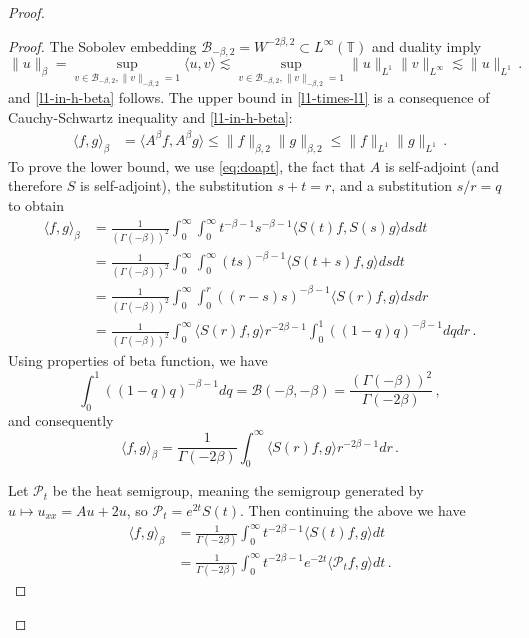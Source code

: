 \documentclass[final]{amsart}
\numberwithin{thm}{section}
\numberwithin{equation}{section}
\newcommand{\Pp}{\mathcal{P}}
\newcommand{\ip}[2]{\langle #1, #2 \rangle}
\newcommand{\T}{\mathbb{T}}
\newcommand{\B}{\mathcal{B}}
\begin{document}
\begin{proof}
\begin{proof}
    The Sobolev embedding $\B_{-\beta,2} = W^{-2\beta,2} \subset L^\infty(\T)$ and duality imply 
    $$
    \|u\|_\beta = \sup_{v \in \B_{-\beta,2}, \|v\|_{-\beta,2} = 1} \ip{u}{v} \lesssim \sup_{v \in \B_{-\beta,2}, \|v\|_{-\beta,2} = 1} \|u\|_{L^1}\|v\|_{L^\infty} \lesssim \|u\|_{L^1} \,.
    $$
and \ref{l1-in-h-beta} follows.  
The  upper bound in \ref{l1-times-l1} is a consequence of Cauchy-Schwartz inequality and \ref{l1-in-h-beta}: 
 \begin{align}
 \ip{f}{g}_\beta &= \ip{A^\beta f}{A^\beta g} \leq \|f\|_{\beta, 2}\|g\|_{\beta, 2} \leq \|f\|_{L^1} \|g\|_{L^1} \,.
 \end{align}
To prove the lower bound, we use \eqref{eq:doapt}, the fact that $A$ is self-adjoint (and therefore $S$ is self-adjoint), the substitution $s + t = r$, 
and a substitution $s/r = q$ to obtain
\begin{align*}
   \ip{f}{g}_\beta &= \frac{1}{(\Gamma(-\beta))^2} 
   \int_{0}^{\infty}\int_{0}^{\infty} t^{-\beta -1} s^{-\beta - 1} 
   \ip{S(t)f}{S(s)g} ds dt \\
   &=  
   \frac{1}{(\Gamma(-\beta))^2} 
   \int_{0}^{\infty}\int_{0}^{\infty} (ts)^{-\beta - 1} 
   \ip{S(t+s)f}{g} ds dt
   \\
   &=
   \frac{1}{(\Gamma(-\beta))^2} 
   \int_{0}^{\infty}\int_{0}^{r} ((r-s)s)^{-\beta - 1} 
   \ip{S(r)f}{g} ds dr
   \\
   &=
   \frac{1}{(\Gamma(-\beta))^2} 
   \int_{0}^{\infty} \ip{S(r)f}{g} r^{-2\beta - 1}\int_{0}^{1} ((1 - q)q)^{-\beta - 1} 
    dq dr \,.
\end{align*}
Using properties of beta function, we have 
$$
\int_{0}^{1} ((1 - q)q)^{-\beta - 1} dq =
\mathcal{B}(-\beta, -\beta) = \frac{(\Gamma(-\beta))^2}{\Gamma(-2\beta)} \,,
$$
and consequently
$$
\ip{f}{g}_\beta = \frac{1}{\Gamma(-2\beta)} 
   \int_{0}^{\infty} \ip{S(r)f}{g} r^{-2\beta - 1} dr \,.
$$  
 
 
 
 
 
 
 
 Let $\Pp_t$ be the heat semigroup, meaning the semigroup generated by $u \mapsto u_{xx} = Au + 2u$, so $\Pp_t = e^{2t}S(t)$. Then continuing the above we have \begin{equation}\label{gamma-inner-product}
    \begin{aligned}
        \ip{f}{g}_\beta &= \frac{1}{\Gamma(-2\beta)}\int_0^\infty t^{-2\beta-1}\ip{S(t)f}{g} dt
        \\
        &= \frac{1}{\Gamma(-2\beta)}\int_0^\infty t^{-2\beta-1}e^{-2t}\ip{\Pp_t f}{g} dt \,.
    \end{aligned}
    \end{equation}


\end{proof}
\end{proof}
\end{document}
